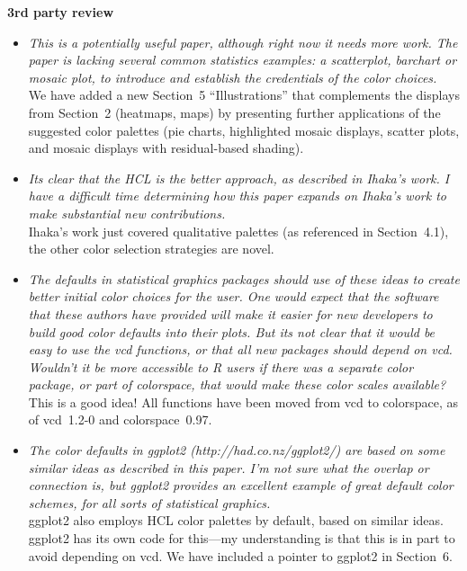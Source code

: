 \documentclass{wuletter}
\begin{document}
\textbf{3rd party review}

\begin{itemize}
  \item \textit{This is a potentially useful paper, although right now it needs more
        work.  The paper is lacking several common statistics examples: a
        scatterplot, barchart or mosaic plot, to introduce and establish the
        credentials of the color choices.}\\[-0.3cm]
	
	We have added a new Section~5 ``Illustrations'' that complements
	the displays from Section~2 (heatmaps, maps) by presenting further
	applications of the suggested color palettes (pie charts,
	highlighted mosaic displays, scatter plots, and mosaic displays
	with residual-based shading).
	
  \item \textit{Its clear that the HCL is the better approach, as described in Ihaka's
        work. I have a difficult time determining how this paper expands on
        Ihaka's work to make substantial new contributions.}\\[-0.3cm]
	
	Ihaka's work just covered qualitative palettes (as referenced in Section~4.1),
	the other color selection strategies are novel.

  \item \textit{The defaults in statistical graphics packages should use of these
        ideas to create better initial color choices for the user. One would
        expect that the software that these authors have provided will make it
        easier for new developers to build good color defaults into their
        plots. But its not clear that it would be easy to use the vcd
        functions, or that all new packages should depend on vcd. Wouldn't it
        be more accessible to R users if there was a separate color package,
        or part of colorspace, that would make these color scales available?}\\[-0.3cm]
	
	This is a good idea! All functions have been moved from vcd to colorspace,
	as of vcd~1.2-0 and colorspace~0.97.

  \item \textit{The color defaults in ggplot2 (http://had.co.nz/ggplot2/) are based on
        some similar ideas as described in this paper. I'm not sure what the
        overlap or connection is, but ggplot2 provides an excellent example of
        great default color schemes, for all sorts of statistical graphics.}\\[-0.3cm]
	
	ggplot2 also employs HCL color palettes by default, based on similar ideas.
        ggplot2 has its own code for this---my understanding is that this is 
	in part to avoid depending on vcd. We have included a pointer to ggplot2
	in Section~6.

\end{itemize}
\end{document}
